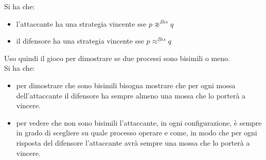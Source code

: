 \documentclass[a4paper,12pt, oneside]{book}
\begin{document}
\begin{teorema}
  Si ha che:
  \begin{itemize}
    \item l'attaccante ha una strategia vincente sse $p\not\approx^{Bis}q$
    \item il difensore ha una strategia vincente sse $p\approx^{Bis}q$
  \end{itemize}
\end{teorema}
Uso quindi il gioco per dimostrare se due processi sono bisimili o meno.\\
Si ha che:
\begin{itemize}
  \item per dimostrare che sono bisimili bisogna mostrare che per ogni mossa
  dell'attaccante il difensore ha sempre almeno una mossa che lo porterà a
  vincere.
  
  \item per vedere che non sono bisimili l'attaccante, in ogni configurazione, è
  sempre in grado di scegliere su quale processo operare e come, in modo che per
  ogni risposta del difensore l'attaccante avrà sempre una mossa che lo porterà
  a vincere. 
\end{itemize}
\end{document}
